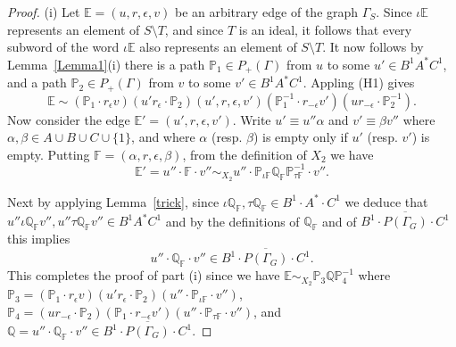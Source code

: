 \documentclass[11pt]{amsart}
\theoremstyle{plain}
\begin{document}
\begin{proof}
(i) Let ${\mathbb{E}} = (u,r,\epsilon,v)$ be an arbitrary edge of the graph $\Gamma_S$. Since $\iota {\mathbb{E}}$ represents an element of $S \setminus T$, and since $T$ is an ideal, it follows that every subword of the word $\iota {\mathbb{E}}$ also represents an element of $S \setminus T$. It now follows by Lemma~\ref{Lemma1}(i) there is a path ${\mathbb{P}}_1 \in P_+(\Gamma)$ from $u$ to some $u' \in B^1 A^* C^1$, and a path ${\mathbb{P}}_2 \in P_+(\Gamma)$ from $v$ to some $v' \in B^1 A^* C^1$. Appling (H1) gives
\[
{\mathbb{E}} \sim
({\mathbb{P}}_1 \cdot r_{\epsilon} v) (u' r_{\epsilon} \cdot {\mathbb{P}}_2)
(u', r, \epsilon, v')
({\mathbb{P}}_1^{-1} \cdot r_{-\epsilon} v') (u r_{-\epsilon} \cdot {\mathbb{P}}_2^{-1}).
\]
Now consider the edge ${\mathbb{E}}' = (u', r, \epsilon, v')$. Write $u' \equiv u'' \alpha$ and $v' \equiv \beta v''$ where $\alpha, \beta \in A \cup B \cup C \cup \{1 \}$, and where $\alpha$ (resp. $\beta$) is empty only if $u'$ (resp. $v'$) is empty. Putting ${\mathbb{F}} = (\alpha, r, \epsilon, \beta)$, from the definition of $X_2$ we have
\[
{\mathbb{E}}' = u'' \cdot {\mathbb{F}} \cdot v'' \sim_{X_2} u'' \cdot {\mathbb{P}}_{\iota {\mathbb{F}}} {\mathbb{Q}}_{\mathbb{F}} {\mathbb{P}}_{\tau {\mathbb{F}}}^{-1} \cdot v''.
\] \begin{sloppypar}
Next by applying Lemma~\ref{trick}, since $\iota {\mathbb{Q}}_{\mathbb{F}}, \tau {\mathbb{Q}}_{\mathbb{F}} \in B^1 \cdot A^* \cdot C^1$ we deduce that $u'' \iota {\mathbb{Q}}_{\mathbb{F}} v'', u'' \tau {\mathbb{Q}}_{\mathbb{F}} v'' \in B^1 A^* C^1$ and by the definitions of ${\mathbb{Q}}_{\mathbb{F}}$ and of $\overline{B^1 \cdot P(\Gamma_G) \cdot C^1}$ this implies  
$$
u'' \cdot {\mathbb{Q}}_{\mathbb{F}} \cdot v'' \in \overline{B^1 \cdot P(\Gamma_G) \cdot C^1}.
$$
This completes the proof of part (i) since we have  
$
{\mathbb{E}} \sim_{X_2} {\mathbb{P}}_3 {\mathbb{Q}} {\mathbb{P}}_4^{-1}
$
where ${\mathbb{P}}_3 = ({\mathbb{P}}_1 \cdot r_{\epsilon} v) (u' r_{\epsilon} \cdot {\mathbb{P}}_2) (u'' \cdot {\mathbb{P}}_{\iota {\mathbb{F}}} \cdot v'')$,
${\mathbb{P}}_4 = (u r_{-\epsilon} \cdot {\mathbb{P}}_2) ({\mathbb{P}}_1 \cdot r_{-\epsilon} v') (u'' \cdot {\mathbb{P}}_{\tau {\mathbb{F}}} \cdot v'')$, and  
${\mathbb{Q}} = u'' \cdot {\mathbb{Q}}_{\mathbb{F}} \cdot v'' \in \overline{B^1 \cdot P(\Gamma_G) \cdot C^1}$. \end{sloppypar}


\end{proof}
\end{document}
